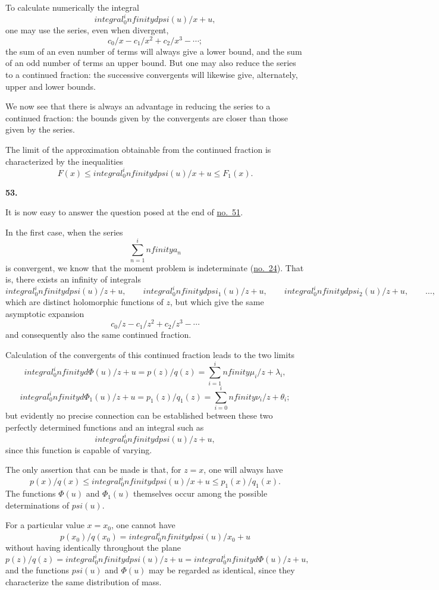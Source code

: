 \documentclass[
  paper=b5,
  fontsize=13pt,
  twoside,
  headings=normal,
  bookmarkpackage=false
]{scrartcl}
\theoremstyle{stieltjesplain}
\theoremstyle{stieltjesdefinition}
\def\int{integral}%
\def\frac#1#2{#1/#2}%
\def\psi{psi}%
\def\infty{infinity}%
\newcommand{\origsection}[1]{%
  \par\addvspace{0.85\baselineskip}%
  \phantomsection\label{sec:#1}%
  \addcontentsline{toc}{subsection}{\texorpdfstring{\S~#1}{Section #1}}%
  \noindent\textbf{#1.}\quad\ignorespaces
}
\begin{document}
To calculate numerically the integral
\[
  \int_0^\infty\frac{d\psi(u)}{x+u},
\]
one may use the series, even when divergent,
\[
  \frac{c_0}{x}-\frac{c_1}{x^2}+\frac{c_2}{x^3}-\cdots;
\]
the sum of an even number of terms will always give a lower bound, and the sum of an odd number of terms an upper bound. But one may also reduce the series to a continued fraction: the successive convergents will likewise give, alternately, upper and lower bounds.

We now see that there is always an advantage in reducing the series to a continued fraction: the bounds given by the convergents are closer than those given by the series.

The limit of the approximation obtainable from the continued fraction is characterized by the inequalities
\[
  F(x)\leq\int_0^\infty\frac{d\psi(u)}{x+u}\leq F_1(x).
\]

\origsection{53}
It is now easy to answer the question posed at the end of \hyperref[sec:51]{no.~51}.

In the first case, when the series
\[
  \sum_{n=1}^\infty a_n
\]
is convergent, we know that the moment problem is indeterminate (\hyperref[sec:24]{no.~24}). That is, there exists an infinity of integrals
\[
  \int_0^\infty\frac{d\psi(u)}{z+u},\qquad
  \int_0^\infty\frac{d\psi_1(u)}{z+u},\qquad
  \int_0^\infty\frac{d\psi_2(u)}{z+u},\qquad\ldots,
\]
which are distinct holomorphic functions of $z$, but which give the same asymptotic expansion
\[
  \frac{c_0}{z}-\frac{c_1}{z^2}+\frac{c_2}{z^3}-\cdots
\]
and consequently also the same continued fraction.

Calculation of the convergents of this continued fraction leads to the two limits
\[
  \int_0^\infty\frac{d\Phi(u)}{z+u}
  =\frac{p(z)}{q(z)}
  =\sum_{i=1}^\infty\frac{\mu_i}{z+\lambda_i},
\]
\[
  \int_0^\infty\frac{d\Phi_1(u)}{z+u}
  =\frac{p_1(z)}{q_1(z)}
  =\sum_{i=0}^\infty\frac{\nu_i}{z+\theta_i};
\]
but evidently no precise connection can be established between these two perfectly determined functions and an integral such as
\[
  \int_0^\infty\frac{d\psi(u)}{z+u},
\]
since this function is capable of varying.

The only assertion that can be made is that, for $z=x$, one will always have
\[
  \frac{p(x)}{q(x)}
  \leq\int_0^\infty\frac{d\psi(u)}{x+u}
  \leq\frac{p_1(x)}{q_1(x)}.
\]
The functions $\Phi(u)$ and $\Phi_1(u)$ themselves occur among the possible determinations of $\psi(u)$.

For a particular value $x=x_0$, one cannot have
\[
  \frac{p(x_0)}{q(x_0)}
  =\int_0^\infty\frac{d\psi(u)}{x_0+u}
\]
without having identically throughout the plane
\[
  \frac{p(z)}{q(z)}
  =\int_0^\infty\frac{d\psi(u)}{z+u}
  =\int_0^\infty\frac{d\Phi(u)}{z+u},
\]
and the functions $\psi(u)$ and $\Phi(u)$ may be regarded as identical, since they characterize the same distribution of mass.
\end{document}
